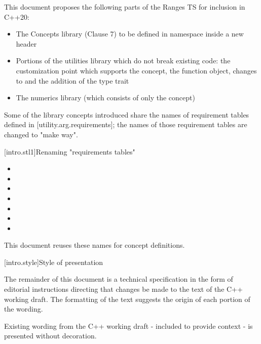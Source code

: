 This document proposes the following parts of the Ranges TS for inclusion in C++20:
\begin{itemize}
\item The Concepts library (Clause 7) to be defined in namespace  inside
  a new  header
\item Portions of the utilities library which do not break existing code: the
   customization point which supports the 
  concept, the  function object, changes to 
  and the addition of the  type trait
\item The numerics library (which consists of only the
   concept)
\end{itemize}
Some of the library concepts introduced share the names of requirement tables
defined in [utility.arg.requirements]; the names of those requirement tables are
changed to "make way".

[intro.stl1]{Renaming "requirements tables"}

\pnum
{}
\begin{itemize}
\item {}
\item {}
\item {}
\item {}
\item {}
\item {}
\item {}
\end{itemize}
This document reuses these names for concept definitions.


[intro.style]{Style of presentation}

\pnum
The remainder of this document is a technical specification in the form of
editorial instructions directing that changes be made to the text of the C++
working draft. The formatting of the text suggests the origin of each portion of
the wording.

Existing wording from the C++ working draft - included to provide context - is
presented without decoration.

